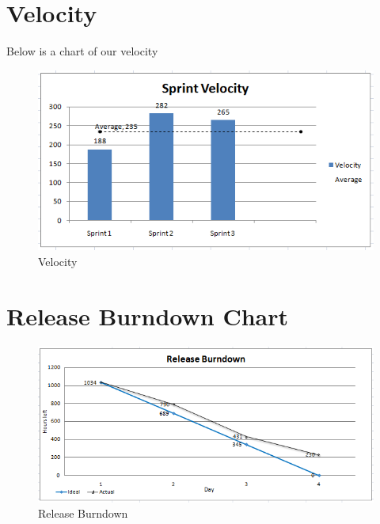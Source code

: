 \section{Velocity}
Below is a chart of our velocity


\begin{figure}[h]
\begin{center}
\includegraphics[scale=0.7]{img/SCRUM/overallVelocity.png}
\caption{Velocity}
\label{fig:Velocity}
\end{center}
\end{figure}



\newpage
\section{Release Burndown Chart}
\label{chap:Release Burndown Chart}
\begin{figure}[h]
\begin{center}
\includegraphics[scale=0.7]{img/SCRUM/releaseBurndown.PNG}
\caption{Release Burndown}
\label{fig:Release Burndown}
\end{center}
\end{figure}





